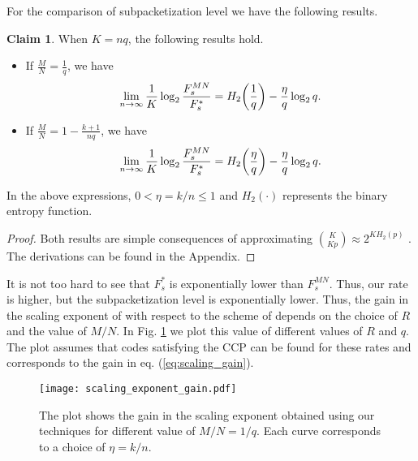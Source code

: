 \documentclass[journal,twocolumn]{IEEEtran}
\theoremstyle{definition}
\newtheorem{claim}{Claim}
\newcommand{\aditya}[1]{\marginpar{+}{\bf Aditya's remark}: {\em #1}}
\newcommand{\litang}[1]{\marginpar{+}{\bf Li's remark}: {\em #1}}
\begin{document}
For the comparison of  subpacketization level we have the following results.
\begin{claim} When $K = nq$, the following results hold.
	\label{claim:compare_MN}
	\begin{itemize}
		\item If  $\frac{M}{N}=\frac{1}{q}$, we have
		\begin{align}
		\lim_{n \rightarrow \infty} \frac{1}{K}\log_2\frac{F_s^{MN}}{F_s^*} = H_2\bigg{(}\frac{1}{q}\bigg{)} -\frac{\eta}{q} \log_2 q. \label{eq:scaling_gain}
		\end{align}
		\item If  $\frac{M}{N}=1-\frac{k+1}{nq}$, we have %
		\begin{align}
		\lim_{n \rightarrow \infty}\frac{1}{K}\log_2\frac{F_s^{MN}}{F_s^*}= H_2\bigg{(}\frac{\eta}{q}\bigg{)}-\frac{\eta}{q} \log_2 q.
		\end{align}
	\end{itemize}
	In the above expressions, $0 < \eta =k/n \le 1$ and $H_2(\cdot)$ represents the binary entropy function. %
\end{claim}
\begin{proof}
	Both results are simple consequences of approximating $\binom{K}{Kp}\approx 2^{KH_2(p)}$ \cite{graham1994concrete}. The derivations can be found in the Appendix.
\end{proof}
It is not too hard to see that $F_s^*$ is exponentially lower than $F_s^{MN}$. Thus, our rate is higher, but the subpacketization level is exponentially lower.
Thus, the gain in the scaling exponent of with respect to the scheme of \cite{maddahN14} depends on the choice of $R$ and the value of $M/N$. In Fig. \ref{fig:scaling_exponent_gain} we plot this value of different values of $R$ and $q$. The plot assumes that codes satisfying the CCP can be found for these rates and corresponds to the gain in eq. (\ref{eq:scaling_gain}).
\begin{figure}[t]
		\centering
		\texttt{[image: scaling\_exponent\_gain.pdf]}
		\caption{The plot shows the gain in the scaling exponent obtained using our techniques for different value of $M/N = 1/q$. Each curve corresponds to a choice of $\eta = k/n$.}
		\label{fig:scaling_exponent_gain}

\end{figure}
\end{document}
